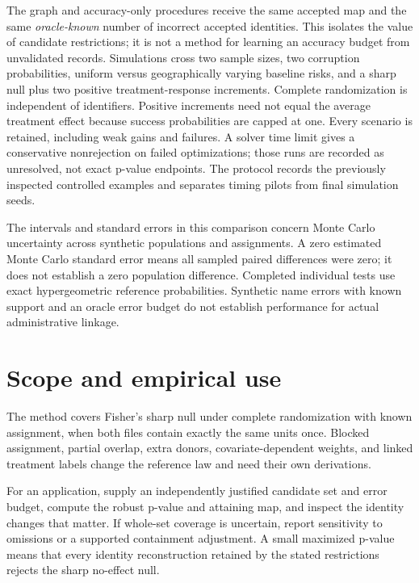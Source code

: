 \documentclass[11pt]{article}
\begin{document}
The graph and accuracy-only procedures receive the same accepted map and the same
\emph{oracle-known} number of incorrect accepted identities. This isolates the value
of candidate restrictions; it is not a method for learning an accuracy budget from
unvalidated records. Simulations cross two sample sizes, two corruption probabilities,
uniform versus geographically varying baseline risks, and a sharp null plus two
positive treatment-response increments. Complete randomization is independent of
identifiers. Positive increments need not equal the average treatment effect because
success probabilities are capped at one. Every scenario is retained, including weak
gains and failures. A solver time limit gives a conservative nonrejection on failed
optimizations; those runs are recorded as unresolved, not exact p-value endpoints. The protocol records the previously inspected controlled examples
and separates timing pilots from final simulation seeds.


The intervals and standard errors in this comparison concern Monte Carlo uncertainty
across synthetic populations and assignments. A zero estimated Monte Carlo standard
error means all sampled paired differences were zero; it does not establish a zero
population difference. Completed individual tests use exact
hypergeometric reference probabilities. Synthetic name errors with known support and
an oracle error budget do not establish performance for actual administrative linkage.

\section{Scope and empirical use}
The method covers Fisher's sharp null under complete randomization with known assignment,
when both files contain exactly the same units once. Blocked assignment, partial overlap,
extra donors, covariate-dependent weights, and linked treatment labels change the reference
law and need their own derivations.

For an application, supply an independently justified candidate set and error budget,
compute the robust p-value and attaining map, and inspect the identity changes that
matter. If whole-set coverage is uncertain, report sensitivity to omissions or a
supported containment adjustment. A small maximized p-value means that every identity
reconstruction retained by the stated restrictions rejects the sharp no-effect null.
\end{document}

